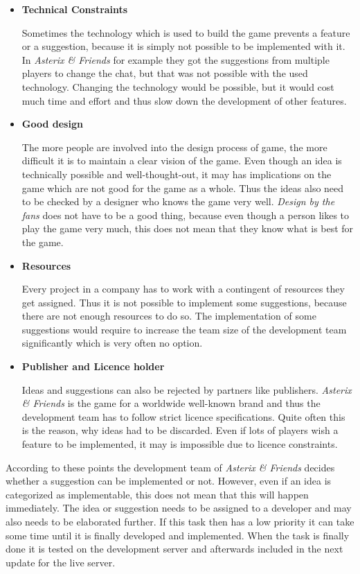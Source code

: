 \begin{itemize}
    \item \textbf{Technical Constraints}
    
    Sometimes the technology which is used to build the game prevents a feature or a suggestion, because it is simply not possible to be implemented with it. In \textit{Asterix \& Friends} for example they got the suggestions from multiple players to change the chat, but that was not possible with the used technology. Changing the technology would be possible, but it would cost much time and effort and thus slow down the development of other features.
    
    \item \textbf{Good design}
    
    The more people are involved into the design process of game, the more difficult it is to maintain a clear vision of the game. Even though an idea is technically possible and well-thought-out, it may has implications on the game which are not good for the game as a whole. Thus the ideas also need to be checked by a designer who knows the game very well. \textit{Design by the fans} does not have to be a good thing, because even though a person likes to play the game very much, this does not mean that they know what is best for the game.
    
    \item \textbf{Resources}
    
    Every project in a company has to work with a contingent of resources they get assigned. Thus it is not possible to implement some suggestions, because there are not enough resources to do so. The implementation of some suggestions would require to increase the team size of the development team significantly which is very often no option.
    
    \item \textbf{Publisher and Licence holder}
    
    Ideas and suggestions can also be rejected by partners like publishers. \textit{Asterix \& Friends} is the game for a worldwide well-known brand and thus the development team has to follow strict licence specifications. Quite often this is the reason, why ideas had to be discarded. Even if lots of players wish a feature to be implemented, it may is impossible due to licence constraints.
\end{itemize}

According to these points the development team of \textit{Asterix \& Friends} decides whether a suggestion can be implemented or not. However, even if an idea is categorized as implementable, this does not mean that this will happen immediately. The idea or suggestion needs to be assigned to a developer and may also needs to be elaborated further. If this task then has a low priority it can take some time until it is finally developed and implemented. When the task is finally done it is tested on the development server and afterwards included in the next update for the live server.\citep{seibert_interview_2016}

